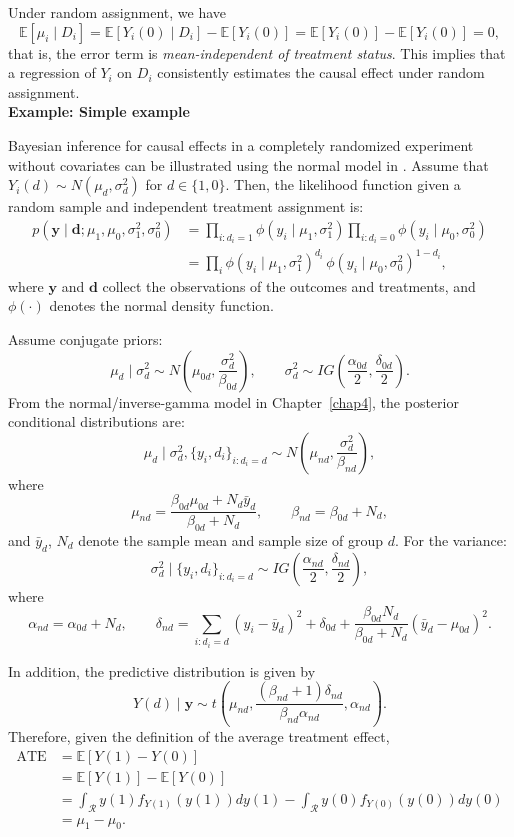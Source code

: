 Under random assignment, we have
\begin{equation}\label{eq:12_1}
	\mathbb{E}[\mu_i \mid D_i] = \mathbb{E}[Y_i(0) \mid D_i] - \mathbb{E}[Y_i(0)] = \mathbb{E}[Y_i(0)] - \mathbb{E}[Y_i(0)] = 0,
\end{equation}
that is, the error term is \textit{mean-independent of treatment status}. This implies that a regression of $Y_i$ on $D_i$ consistently estimates the causal effect under random assignment.\\

\textbf{Example: Simple example}

Bayesian inference for causal effects in a completely randomized experiment without covariates can be illustrated using the normal model in \cite{rubin1990neyman}. Assume that $Y_i(d) \sim N(\mu_d, \sigma_d^2)$ for $d \in \{1,0\}$. Then, the likelihood function given a random sample and independent treatment assignment is:
\begin{align*}
	p(\mathbf{y} \mid \mathbf{d}; \mu_1,\mu_0,\sigma^2_1,\sigma^2_0)
	&= \prod_{i:d_i=1}\phi(y_i \mid \mu_1,\sigma_1^2) \prod_{i:d_i=0}\phi(y_i \mid \mu_0,\sigma_0^2) \\
	&= \prod_{i}\phi(y_i \mid \mu_1,\sigma_1^2)^{d_i} \, \phi(y_i \mid \mu_0,\sigma_0^2)^{1-d_i},
\end{align*}
where $\mathbf{y}$ and $\mathbf{d}$ collect the observations of the outcomes and treatments, and $\phi(\cdot)$ denotes the normal density function.

Assume conjugate priors: 
\[
\mu_d \mid \sigma^2_d \sim N\left(\mu_{0d}, \frac{\sigma^2_d}{\beta_{0d}}\right), 
\qquad 
\sigma^2_d \sim IG\left(\frac{\alpha_{0d}}{2}, \frac{\delta_{0d}}{2}\right).
\]
From the normal/inverse-gamma model in Chapter~\ref{chap4}, the posterior conditional distributions are:
\[
\mu_d \mid \sigma^2_d, \{y_i,d_i\}_{i:d_i=d} \sim N \left(\mu_{nd}, \frac{\sigma^2_d}{\beta_{nd}}\right), 
\]
where
\[
\mu_{nd} = \frac{\beta_{0d}\mu_{0d} + N_d \bar{y}_d}{\beta_{0d} + N_d}, 
\qquad 
\beta_{nd} = \beta_{0d} + N_d,
\]
and $\bar{y}_d$, $N_d$ denote the sample mean and sample size of group $d$. For the variance:
\[
\sigma^2_d \mid \{y_i,d_i\}_{i:d_i=d} \sim IG\left(\frac{\alpha_{nd}}{2}, \frac{\delta_{nd}}{2}\right),
\]
where
\[
\alpha_{nd} = \alpha_{0d} + N_d,
\qquad 
\delta_{nd} = \sum_{i:d_i=d} (y_i-\bar{y}_d)^2 + \delta_{0d} + \frac{\beta_{0d}N_d}{\beta_{0d}+N_d}(\bar{y}_d-\mu_{0d})^2.
\]

In addition, the predictive distribution is given by
\[
Y(d)\mid \mathbf{y}\sim t\left(\mu_{nd},\frac{(\beta_{nd}+1)\delta_{nd}}{\beta_{nd}\alpha_{nd}},\alpha_{nd}\right).
\]
Therefore, given the definition of the average treatment effect, 
\begin{align*}
 \text{ATE} & = \mathbb{E}[Y(1) - Y(0)]\\
 & = \mathbb{E}[Y(1)] - \mathbb{E}[Y(0)]\\
 & = \int_{\mathcal{R}} y(1) f_{Y(1)}(y(1))dy(1) - \int_{\mathcal{R}} y(0) f_{Y(0)}(y(0))dy(0)\\
 & = \mu_{1} - \mu_{0}.
\end{align*}

